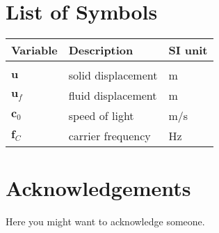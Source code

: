 \documentclass{Configuration_Files/PoliMi3i_thesis}
\begin{document}

% 


\cleardoublepage
{} %


\glsaddall
\printglossaries[type=\acronymtype,title=Acronyms]

\listoffigures

\listoftables

\chapter*{List of Symbols} %
\begin{table}[H]
    \centering
    \begin{tabular}{lll}
        \textbf{Variable} & \textbf{Description} & \textbf{SI unit} \\\hline\\[-9px]
        $\bm{u}$ & solid displacement & m \\[2px]
        $\bm{u}_f$ & fluid displacement & m \\[2px]
        $\bm{c}_0$ & speed of light & m/s \\[2px]
        $\bm{f}_C$ & carrier frequency & Hz \\[2px]
    \end{tabular}
\end{table}

\chapter*{Acknowledgements}
Here you might want to acknowledge someone.

\cleardoublepage
\end{document}
